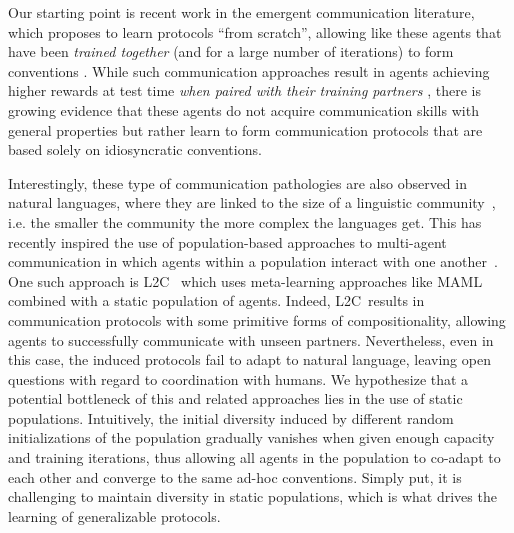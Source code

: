 \documentclass{article}
\newcommand{\ltc}{\textsc{L2C\xspace}}
\begin{document}
Our starting point is recent work in the emergent communication literature, which proposes to learn protocols ``from scratch'', allowing like these agents that have been \emph{trained together} (and for a large number of iterations) to form conventions \citep{sukhbaatar2016learning,lazaridou_multi-agent_2016,foerster_learning_2016,kharitonov_information_2019}. While such communication approaches result in agents achieving higher rewards at test time \emph{when paired with their training partners} \citep{kottur2017natural,graesser_emergent_2019,lazaridou_emergence_2018}, there is growing evidence that these agents do not acquire communication skills with general properties \citep{lowe_pitfalls_2019,bouchacourt_miss_2019,DBLP:conf/acl/ChaabouniKBDB20,DBLP:journals/corr/abs-2003-02979} but rather learn to form communication protocols that are based solely on idiosyncratic conventions.

Interestingly, these type of communication pathologies are also observed in natural languages, where they are linked to the size of a linguistic community~\citep{Reali:etal:2018, Wray:Grace:2007,Trudgill:2011,Lupyan:Dale:2010}, i.e. the smaller the community the more complex the languages get. This has recently inspired the use of population-based approaches to multi-agent communication in which agents within a population interact with one another~\citep{tieleman_shaping_2018,cogswell_emergence_2019,fitzgerald2019populate,gupta-etal-2019-seeded}. One such approach is \ltc\ \citep{lowe_learning_2019} which uses meta-learning approaches like MAML \citep{finn_model-agnostic_2017} combined with a static population of agents. Indeed, \ltc\ results in communication protocols with some primitive forms of compositionality, allowing agents to successfully communicate with unseen partners. Nevertheless, even in this case, the induced protocols fail to adapt to natural language, leaving open questions with regard to coordination with humans. We hypothesize that a potential bottleneck of this and related approaches lies in the use of static populations. Intuitively, the initial diversity induced by different random initializations of the population gradually vanishes when given enough capacity and training iterations, thus allowing all agents in the population to co-adapt to each other and converge to the same ad-hoc conventions. Simply put, it is challenging to maintain diversity in static populations, which is what drives the learning of generalizable protocols. 
\end{document}
